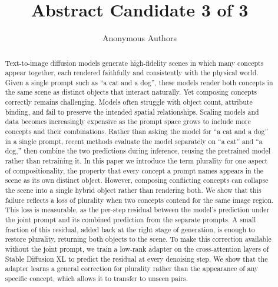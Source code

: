 \documentclass{article}
\title{Abstract Candidate 3 of 3}
\author{Anonymous Authors}
\begin{document}
\maketitle

\begin{abstract}
Text-to-image diffusion models generate high-fidelity scenes in which many concepts appear together, each rendered faithfully and consistently with the physical world. Given a single prompt such as ``a cat and a dog'', these models render both concepts in the same scene as distinct objects that interact naturally. Yet composing concepts correctly remains challenging. Models often struggle with object count, attribute binding, and fail to preserve the intended spatial relationships. Scaling models and data becomes increasingly expensive as the prompt space grows to include more concepts and their combinations. Rather than asking the model for ``a cat and a dog'' in a single prompt, recent methods evaluate the model separately on ``a cat'' and ``a dog,'' then combine the two predictions during inference, reusing the pretrained model rather than retraining it. In this paper we introduce the term plurality for one aspect of compositionality, the property that every concept a prompt names appears in the scene as its own distinct object. However, composing conflicting concepts can collapse the scene into a single hybrid object rather than rendering both. We show that this failure reflects a loss of plurality when two concepts contend for the same image region. This loss is measurable, as the per-step residual between the model's prediction under the joint prompt and its combined prediction from the separate prompts. A small fraction of this residual, added back at the right stage of generation, is enough to restore plurality, returning both objects to the scene. To make this correction available without the joint prompt, we train a low-rank adapter on the cross-attention layers of Stable Diffusion XL to predict the residual at every denoising step. We show that the adapter learns a general correction for plurality rather than the appearance of any specific concept, which allows it to transfer to unseen pairs.
\end{abstract}
\end{document}
